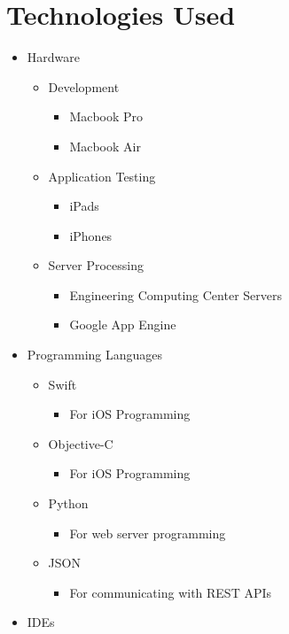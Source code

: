\chapter{Technologies Used}

\begin{itemize}
    \item Hardware
    \begin{itemize}
   	 \item Development
	 \begin{itemize}
   	 	\item Macbook Pro
		\item Macbook Air
	\end{itemize}
	 \item Application Testing
	  \begin{itemize}
   	 	\item iPads
		\item iPhones
	\end{itemize}
	 \item Server Processing
	  \begin{itemize}
   	 	\item Engineering Computing Center Servers
		\item Google App Engine
	\end{itemize}
    \end{itemize}
    \item Programming Languages
     \begin{itemize}
   	 	\item Swift
		 \begin{itemize}
   	 		\item For iOS Programming
		\end{itemize}
		\item Objective-C
		 \begin{itemize}
           	 	\item For iOS Programming
       	 	\end{itemize}
		\item Python
		 \begin{itemize}
   	 		\item For web server programming
		\end{itemize}
		\item JSON
		\begin{itemize}
   	 		\item For communicating with REST APIs
		\end{itemize}
	\end{itemize}
    \item IDEs

\end{itemize}

